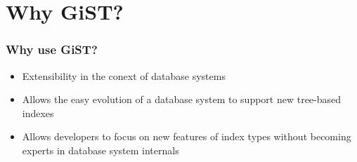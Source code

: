 \documentclass{beamer}
\begin{document}
\section {Why GiST?}
\begin{frame}%
  \frametitle{Why use GiST?} %
  
  \begin {itemize}
  \item Extensibility in the conext of database systems
  \pause \item Allows the easy evolution of a database system to support new tree-based indexes
  \pause \item Allows developers to focus on new features of index types without becoming experts in database system internals
  \end {itemize}
\end{frame}
\end{document}
